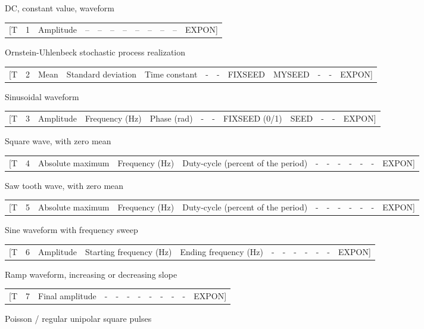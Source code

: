 \documentclass[10pt,landscape]{article}
\begin{document}
DC, constant value, waveform\\
\begin{tabular}{rrrrrrrrrrrr}
[T & 1 & Amplitude & -- & -- & -- & -- & -- & -- & -- & -- & EXPON]
\end{tabular}

Ornstein-Uhlenbeck stochastic process realization\\

\begin{tabular}{rrrrrrrrrrrr}
[T & 2 & Mean  & Standard deviation & Time constant & - & - & FIXSEED & MYSEED & - & - & EXPON]
\end{tabular}

Sinusoidal waveform\\

\begin{tabular}{rrrrrrrrrrrr}
[T & 3 & Amplitude & Frequency (Hz) & Phase (rad) & - & - & FIXSEED (0/1) & SEED & - & - & EXPON]
\end{tabular}


Square wave, with zero mean\\

\begin{tabular}{rrrrrrrrrrrr}
[T & 4 & Absolute maximum & Frequency (Hz) & Duty-cycle (percent of the period) & - & - & - & - & - & - & EXPON]
\end{tabular}


Saw tooth wave, with zero mean\\

\begin{tabular}{rrrrrrrrrrrr}
[T & 5 & Absolute maximum & Frequency (Hz) & Duty-cycle (percent of the period) & - & - & - & - & - & - & EXPON]
\end{tabular}


Sine waveform with frequency sweep\\

\begin{tabular}{rrrrrrrrrrrr}
[T & 6 & Amplitude & Starting frequency (Hz) & Ending frequency (Hz) & - & - & - & - & - & - & EXPON]
\end{tabular}


Ramp waveform, increasing or decreasing slope\\

\begin{tabular}{rrrrrrrrrrrr}
[T & 7 & Final amplitude & - & - & - & - & - & - & - & - & EXPON]
\end{tabular}


Poisson / regular unipolar square pulses\\
\end{document}
